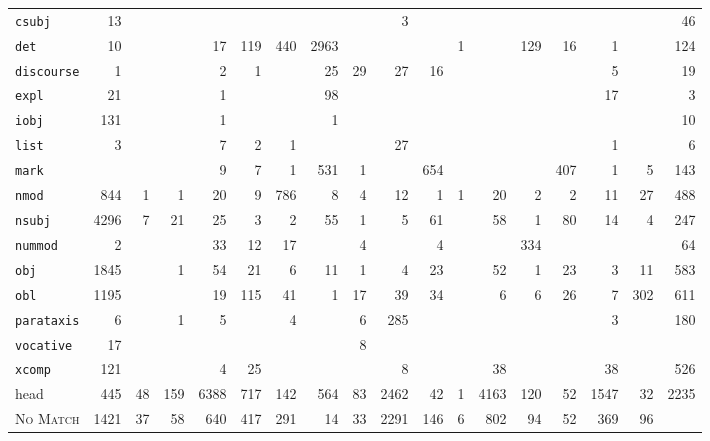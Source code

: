 \documentclass[extrafontsizes,60pt,twocolumn]{memoir}
\begin{document}
\begin{minipage}{.5\columnwidth}
\begin{center}
{\begin{tabular}{lRRRRRRRRRRRRRRRR|R}
\texttt{csubj} & 13 &  &  &  &  &  &  &  & 3 &  &  &  &  &  &  &  & 46 \\
\texttt{det} & 10 &  &  & 17 & 119 & 440 & 2963 &  &  &  & 1 &  & 129 & 16 & 1 &  & 124 \\
\texttt{discourse} & 1 &  &  & 2 & 1 &  & 25 & 29 & 27 & 16 &  &  &  &  & 5 &  & 19 \\
\texttt{expl} & 21 &  &  & 1 &  &  & 98 &  &  &  &  &  &  &  & 17 &  & 3 \\
\texttt{iobj} & 131 &  &  & 1 &  &  & 1 &  &  &  &  &  &  &  &  &  & 10 \\
\texttt{list} & 3 &  &  & 7 & 2 & 1 &  &  & 27 &  &  &  &  &  & 1 &  & 6 \\
\texttt{mark} &  &  &  & 9 & 7 & 1 & 531 & 1 &  & 654 &  &  &  & 407 & 1 & 5 & 143 \\
\texttt{nmod} & 844 & 1 & 1 & 20 & 9 & 786 & 8 & 4 & 12 & 1 & 1 & 20 & 2 & 2 & 11 & 27 & 488 \\
\texttt{nsubj} & 4296 & 7 & 21 & 25 & 3 & 2 & 55 & 1 & 5 & 61 &  & 58 & 1 & 80 & 14 & 4 & 247 \\
\texttt{nummod} & 2 &  &  & 33 & 12 & 17 &  & 4 &  & 4 &  &  & 334 &  &  &  & 64 \\
\texttt{obj} & 1845 &  & 1 & 54 & 21 & 6 & 11 & 1 & 4 & 23 &  & 52 & 1 & 23 & 3 & 11 & 583 \\
\texttt{obl} & 1195 &  &  & 19 & 115 & 41 & 1 & 17 & 39 & 34 &  & 6 & 6 & 26 & 7 & 302 & 611 \\
\texttt{parataxis} & 6 &  & 1 & 5 &  & 4 &  & 6 & 285 &  &  &  &  &  & 3 &  & 180 \\
\texttt{vocative} & 17 &  &  &  &  &  &  & 8 &  &  &  &  &  &  &  &  &  \\
\texttt{xcomp} & 121 &  &  & 4 & 25 &  &  &  & 8 &  &  & 38 &  &  & 38 &  & 526 \\
\hline
head & 445 & 48 & 159 & 6388 & 717 & 142 & 564 & 83 & 2462 & 42 & 1 & 4163 & 120 & 52 & 1547 & 32 & 2235 \\
\hline
\textsc{No Match} & 1421 & 37 & 58 & 640 & 417 & 291 & 14 & 33 & 2291 & 146 & 6 & 802 & 94 & 52 & 369 & 96 & 
\end{tabular}}
\end{center}
\end{minipage}
\end{document}
